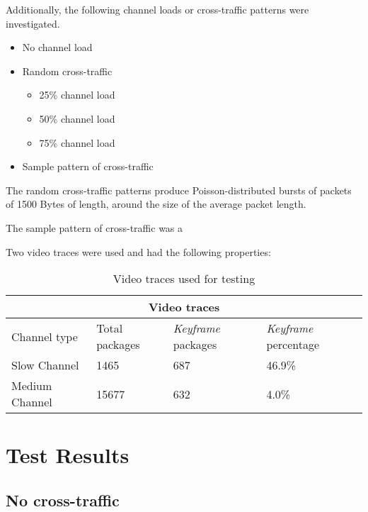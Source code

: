 Additionally, the following channel loads or cross-traffic patterns were investigated.

\begin{itemize}
	\item{No channel load}
	\item{Random cross-traffic}
		\begin{itemize}
			\item{25\% channel load}
			\item{50\% channel load}
			\item{75\% channel load}
		\end{itemize}
	\item{Sample pattern of cross-traffic}
\end{itemize}

The random cross-traffic patterns produce Poisson-distributed bursts of packets of 1500 Bytes of length, around the size of the average packet length. 

The sample pattern of cross-traffic was a 

Two video traces were used and had the following properties:

\begin{table}[htbp]
\caption{Video traces used for testing}
\break
\setlength{\arrayrulewidth}{1mm}
\setlength{\tabcolsep}{12pt}
\renewcommand{\arraystretch}{1.5}
 {
\begin{tabular}{ |p{3cm}|p{3cm}|p{3cm}|p{3cm}|  }
\hline
\multicolumn{4}{|c|}{Video traces} \\
\hline
Channel type & Total packages & \textit{Keyframe} packages & \textit{Keyframe} percentage\\
\hline
Slow Channel & 1465 & 687 & 46.9\%\\
Medium Channel & 15677 & 632 & 4.0\%\\

\hline
\end{tabular}
}
\end{table}




\section{Test Results}

\subsection{No cross-traffic}

